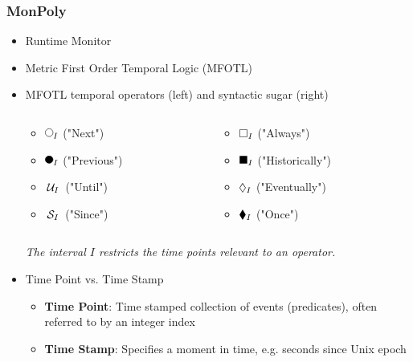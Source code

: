 \begin{frame}
    \frametitle{MonPoly}
    \begin{itemize}
        \item Runtime Monitor
        \item Metric First Order Temporal Logic (MFOTL)
        \item MFOTL temporal operators (left) and syntactic sugar (right)
        \begin{columns}
            \begin{column}{0.4\textwidth}
                \begin{itemize}
                    \item $\Next{I}$ ("Next")
                    \item $\Previous{I}$ ("Previous")
                    \item $\,\mathcal{U}_{I}\,$ ("Until")
                    \item $\,\mathcal{S}_{I}\,$ ("Since")
                \end{itemize}
            \end{column}
            \begin{column}{0.4\textwidth}
                \begin{itemize}
                    \item $\square_{I}$ ("Always")
                    \item $\blacksquare_{I}$ ("Historically")
                    \item $\lozenge_{I}$ ("Eventually")
                    \item $\blacklozenge_{I}$ ("Once")
                \end{itemize}
            \end{column}
        \end{columns}
        \vspace{.2cm}
        \textit{The interval $I$ restricts the time points relevant to an operator.}
        \item Time Point vs. Time Stamp
        \begin{itemize}
            \item \textbf{Time Point}: Time stamped collection of events (predicates), often referred to by an integer index
            \item \textbf{Time Stamp}: Specifies a moment in time, e.g. seconds since Unix epoch
        \end{itemize}

    \end{itemize}
\end{frame}



